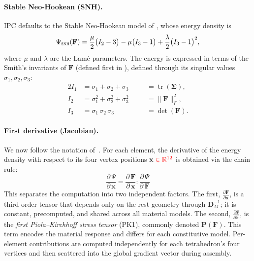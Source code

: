 \documentclass{article}
\newcommand{\pd}[2]{\dfrac{\partial\, #1}{\partial\, #2}}
\newcommand{\pdc}[2]{\frac{\partial #1}{\partial #2}}
\newcommand{\red}[1]{\textcolor{red}{#1}}
\begin{document}
\paragraph{Stable Neo-Hookean (SNH).}
IPC defaults to the Stable Neo-Hookean model of \cite{smith2019analytic}, whose energy density is
\begin{equation}
    \Psi_{\textsc{snh}}(\mathbf{F})
    = \frac{\mu}{2}\bigl(I_2 - 3\bigr)
      - \mu\bigl(I_3 - 1\bigr)
      + \frac{\lambda}{2}\bigl(I_3 - 1\bigr)^2,
\end{equation}
where $\mu$ and $\lambda$ are the Lam\'{e} parameters. The energy is expressed in terms of the Smith's invariants of $\mathbf{F}$ (defined first in \cite{smith2019analytic}), defined through its singular values $\sigma_1,\sigma_2,\sigma_3$:
\begin{alignat}{2}
    I_1 &= \sigma_1 + \sigma_2 + \sigma_3
        &&= \operatorname{tr}(\boldsymbol{\Sigma}), \\[0.5ex]
    I_2 &= \sigma_1^2 + \sigma_2^2 + \sigma_3^2
        \quad&&= \|\mathbf{F}\|_F^2, \\[0.5ex]
    I_3 &= \sigma_1\,\sigma_2\,\sigma_3
        &&= \det(\mathbf{F}).
\end{alignat}



\paragraph{First derivative (Jacobian).}
We now follow the notation of~\cite{kim2020dynamic}. For each element, the derivative of the energy density with respect to its four vertex positions $\mathbf{x}\;\red{\in\mathbb{R}^{12}}$ is obtained via the chain rule:
\begin{equation}
    \pd{\Psi}{\mathbf{x}}
    = \pd{\mathbf{F}}{\mathbf{x}} : \pd{\Psi}{\mathbf{F}}
\end{equation}
This separates the computation into two independent factors. The first, $\pdc{\mathbf{F}}{\mathbf{x}}$, is a third-order tensor that depends only on the rest geometry through $\mathbf{D}_M^{-1}$; it is constant, precomputed, and shared across all material models. The second, $\pdc{\Psi}{\mathbf{F}}$, is the \emph{first Piola--Kirchhoff stress tensor} (PK1), commonly denoted $\mathbf{P}(\mathbf{F})$. This term encodes the material response and differs for each constitutive model.
\newline Per-element contributions are computed independently for each tetrahedron's four vertices and then scattered into the global gradient vector during assembly. 
\end{document}
